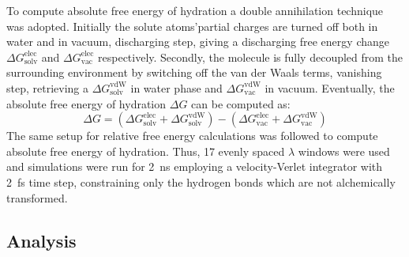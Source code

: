 \documentclass[journal=jctcce,manuscript=article]{achemso}
\begin{document}
To compute absolute free energy of hydration a double annihilation technique~\cite{jorgensen1988efficient,GILSON19971047,Bosisio2016}
was adopted. 
Initially the solute atoms'partial charges are turned off both in water and in vacuum, discharging step, giving a discharging
free energy change $\Delta G_\mathrm{solv}^\mathrm{elec}$ and $\Delta G_\mathrm{vac}^\mathrm{elec}$ respectively. Secondly,
the molecule is fully decoupled from the surrounding environment by switching off the van der Waals terms, vanishing step, retrieving a $\Delta G_\mathrm{solv}^\mathrm{vdW}$ in water phase and $\Delta G_\mathrm{vac}^\mathrm{vdW}$ in vacuum. 
Eventually, the absolute free energy of hydration $\Delta G$ can be computed as:
\begin{equation}
\label{eq:absolutehyd}
\Delta G = (\Delta G_\mathrm{solv}^\mathrm{elec} + \Delta G_\mathrm{solv}^\mathrm{vdW}) - (\Delta G_\mathrm{vac}^\mathrm{elec} + \Delta G_\mathrm{vac}^\mathrm{vdW})
\end{equation}
The same setup for relative free energy calculations was followed to compute absolute free energy of hydration. Thus, 17 evenly spaced $\lambda$ windows were used and simulations were run for \SI{2}{ns} employing a velocity-Verlet integrator with \SI{2}{fs} time step, constraining only the hydrogen bonds which are not alchemically transformed. 


\subsection{Analysis}
\label{sec:analysis}
\end{document}
